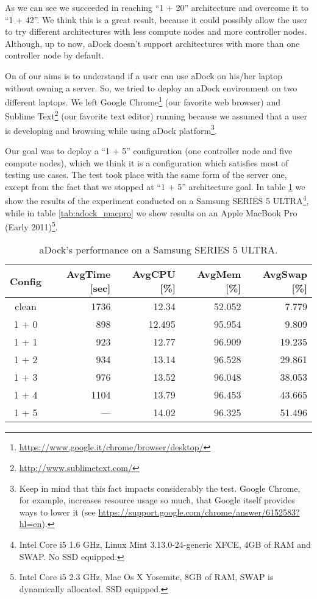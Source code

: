As we can see we succeeded in reaching ``1 + 20'' architecture and overcome it to ``1 + 42''. We think this is a great result, because it could possibly allow the user to try different architectures with less compute nodes and more controller nodes. Although, up to now, aDock doesn't support architectures with more than one controller node by default.

On of our aims is to understand if a user can use aDock on his/her laptop without owning a server. So, we tried to deploy an aDock environment on two different laptops. We left Google Chrome\footnote{\url{https://www.google.it/chrome/browser/desktop/}} (our favorite web browser) and Sublime Text\footnote{\url{http://www.sublimetext.com/}} (our favorite text editor) running because we assumed that a user is developing and browsing while using aDock platform\footnote{Keep in mind that this fact impacts considerably the test. Google Chrome, for example, increases resource usage so much, that Google itself provides ways to lower it (see \url{https://support.google.com/chrome/answer/6152583?hl=en}).}.

Our goal was to deploy a ``1 + 5'' configuration (one controller node and five compute nodes), which we think it is a configuration which satisfies most of testing use cases. The test took place with the same form of the server one, except from the fact that we stopped at ``1 + 5'' architecture goal. In table \ref{tab:adock_ultra} we show the results of the experiment conducted on a Samsung SERIES 5 ULTRA\footnote{Intel Core i5 1.6 GHz, Linux Mint 3.13.0-24-generic XFCE, 4GB of RAM and SWAP. No SSD equipped.}, while in table \ref{tab:adock_macpro} we show results on an Apple MacBook Pro (Early 2011)\footnote{Intel Core i5 2.3 GHz, Mac Os X Yosemite, 8GB of RAM, SWAP is dynamically allocated. SSD equipped.}.

\begin{table}[h!]
\centering
  \begin{tabular}{| c | r | r | r | r |}
  \hline
  \textbf{Config} & \textbf{AvgTime [sec]} & \textbf{AvgCPU [\%]} & \textbf{AvgMem [\%]} & \textbf{AvgSwap [\%]}  \\
  \hline
  clean & 1736 & 12.34 & 52.052 & 7.779 \\
  \hline
  1 + 0 & 898 & 12.495 & 95.954 & 9.809 \\
  \hline
  1 + 1 & 923 & 12.77 & 96.909 & 19.235 \\
  \hline
  1 + 2 & 934 & 13.14 & 96.528 & 29.861 \\
  \hline
  1 + 3 & 976 & 13.52 & 96.048 & 38.053 \\
  \hline
  1 + 4 & 1104 & 13.79 & 96.453 & 43.665 \\
  \hline
  1 + 5 & --- & 14.02 & 96.325 & 51.496 \\
  \hline
  \end{tabular}
  \vspace{2mm}
  \caption{aDock's performance on a Samsung SERIES 5 ULTRA.}
  \label{tab:adock_ultra}
\end{table}

